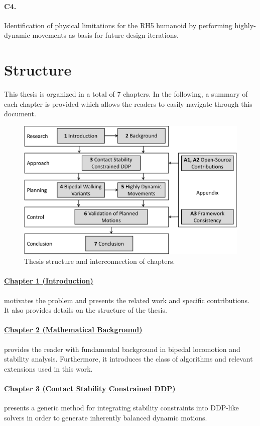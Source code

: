 \paragraph{C4.} Identification of physical limitations for the RH5 humanoid by performing highly-dynamic movements as basis for future design iterations.   

\section{Structure}
This thesis is organized in a total of 7 chapters. 
In the following, a summary of each chapter is provided which allows the readers to easily navigate through this document.

\begin{figure}
\centering	
\includegraphics[width=.8\textwidth]{img/structure2}
\caption[Thesis structure and interconnection of chapters]{Thesis structure and interconnection of chapters.}
\label{img:structure}
\end{figure}

\paragraph{\hyperref[c1]{Chapter 1 (Introduction)}} motivates the problem and presents the related work and specific contributions. It also provides details on the structure of the thesis.
\paragraph{\hyperref[c2]{Chapter 2 (Mathematical Background)}} provides the reader with fundamental background in bipedal locomotion and stability analysis. Furthermore, it introduces the class of algorithms and relevant extensions used in this work.
\paragraph{\hyperref[c3]{Chapter 3 (Contact Stability Constrained DDP)}} presents a generic method for integrating stability constraints into DDP-like solvers in order to generate inherently balanced dynamic motions.
